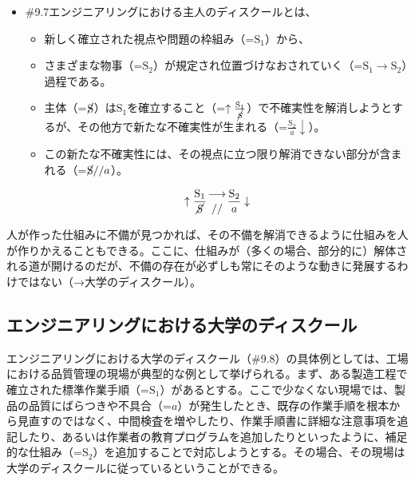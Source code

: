 \begin{note}{}
  \begin{itemize}
    \tightlist
    \item{\#9.7}エンジニアリングにおける主人のディスクールとは、
      \begin{itemize}
        \tightlist
        \item 新しく確立された視点や問題の枠組み（=$\textrm{S}_1$）から、
        \item さまざまな物事（=$\textrm{S}_2$）が規定され位置づけなおされていく（=$\textrm{S}_1\rightarrow\textrm{S}_2$）過程である。
        \item 主体（=$\cancel{\textrm{S}}$）は$\textrm{S}_1$を確立すること（=$\uparrow\frac{\mathrm{S_1}}{\mathrm{\cancel{S}}}$）で不確実性を解消しようとするが、その他方で新たな不確実性が生まれる（=$\frac{\mathrm{S_2}}{a}\downarrow$）。
        \item この新たな不確実性には、その視点に立つ限り解消できない部分が含まれる（=$\cancel{\textrm{S}}//a$）。
      \end{itemize}

$$
\uparrow\frac{\mathrm{S_1}}{\mathrm{\cancel{S}}}\genfrac{}{}{0pt}{}{\longrightarrow}{//}\frac{\mathrm{S_2}}{a}\downarrow
$$
  \end{itemize}
\end{note}

人が作った仕組みに不備が見つかれば、その不備を解消できるように仕組みを人が作りかえることもできる。ここに、仕組みが（多くの場合、部分的に）解体される道が開けるのだが、不備の存在が必ずしも常にそのような動きに発展するわけではない（→大学のディスクール）。

\subsection{エンジニアリングにおける大学のディスクール}\label{ux30a8ux30f3ux30b8ux30cbux30a2ux30eaux30f3ux30b0ux306bux304aux3051ux308bux5927ux5b66ux306eux30c7ux30a3ux30b9ux30afux30fcux30eb}

エンジニアリングにおける大学のディスクール（\#9.8）の具体例としては、工場における品質管理の現場が典型的な例として挙げられる。まず、ある製造工程で確立された標準作業手順（=\(\textrm{S}_1\)）があるとする。ここで少なくない現場では、製品の品質にばらつきや不具合（=\(a\)）が発生したとき、既存の作業手順を根本から見直すのではなく、中間検査を増やしたり、作業手順書に詳細な注意事項を追記したり、あるいは作業者の教育プログラムを追加したりといったように、補足的な仕組み（=\(\textrm{S}_2\)）を追加することで対応しようとする。その場合、その現場は大学のディスクールに従っているということができる。

